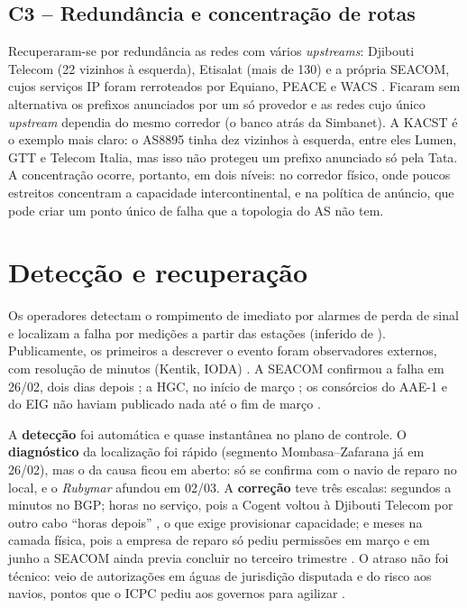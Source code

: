 \documentclass[12pt]{article}
\begin{document}
\subsection{C3 -- Redundância e concentração de rotas}

Recuperaram-se por redundância as redes com vários \textit{upstreams}: Djibouti Telecom
(22 vizinhos à esquerda), Etisalat (mais de 130) e a própria SEACOM, cujos serviços IP
foram rerroteados por Equiano, PEACE e WACS \cite{seacom2024a}. Ficaram sem alternativa os
prefixos anunciados por um só provedor e as redes cujo único \textit{upstream} dependia do
mesmo corredor (o banco atrás da Simbanet). A KACST é o exemplo mais claro: o AS8895 tinha
dez vizinhos à esquerda, entre eles Lumen, GTT e Telecom Italia, mas isso não protegeu um
prefixo anunciado só pela Tata. A concentração ocorre, portanto, em dois níveis: no
corredor físico, onde poucos estreitos concentram a capacidade intercontinental, e na
política de anúncio, que pode criar um ponto único de falha que a topologia do AS não tem.

\section{Detec\c{c}\~ao e recupera\c{c}\~ao}

Os operadores detectam o rompimento de imediato por alarmes de perda de sinal e localizam
a falha por medições a partir das estações (inferido de \cite{itug977}). Publicamente,
os primeiros a descrever o evento foram observadores externos, com resolução de minutos
(Kentik, IODA) \cite{madory2024}. A SEACOM confirmou a falha em 26/02, dois dias depois
\cite{seacom2024a}; a HGC, no início de março \cite{hgc2024b}; os consórcios do AAE-1 e do EIG não
haviam publicado nada até o fim de março \cite{madory2024}.

A \textbf{detecção} foi automática e quase instantânea no plano de controle. O
\textbf{diagnóstico} da localização foi rápido (segmento Mombasa--Zafarana já em 26/02),
mas o da causa ficou em aberto: só se confirma com o navio de reparo no local, e o
\textit{Rubymar} afundou em 02/03. A \textbf{correção} teve três escalas: segundos a
minutos no BGP; horas no serviço, pois a Cogent voltou à Djibouti Telecom por outro cabo
``horas depois'' \cite{madory2024}, o que exige provisionar capacidade; e meses na camada
física, pois a empresa de reparo só pediu permissões em março \cite{seacom2024c} e em
junho a SEACOM ainda previa concluir no terceiro trimestre \cite{seacom2024b}. O atraso não
foi técnico: veio de autorizações em águas de jurisdição disputada e do risco aos navios,
pontos que o ICPC pediu aos governos para agilizar \cite{icpc2024}.
\end{document}
